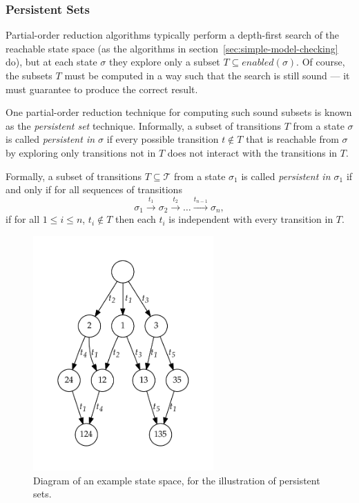 \documentclass[12pt,a4paper,twoside,openright]{report}
\begin{document}
\subsubsection{Persistent Sets}
Partial-order reduction algorithms typically 
perform a depth-first
search of the reachable state space
(as the algorithms in
section~\ref{sec:simple-model-checking} do), but at each
state $\sigma$ they explore only a subset
$T \subseteq \textit{enabled}(\sigma)$. Of course, the subsets
$T$ must be computed in a way such that the search
is still sound --- it must guarantee to
produce the correct result.

One partial-order reduction technique for
computing such sound subsets is known
as the \emph{persistent set} technique. Informally,
a subset of transitions $T$ from a state $\sigma$
is called \emph{persistent in $\sigma$} if every
possible transition $t \not \in T$ that is reachable
from $\sigma$ by exploring only transitions not in
$T$ does not interact with the transitions
in $T$.

Formally, a subset of transitions $T \subseteq \mathcal{T}$
from a state $\sigma_1$
is called \emph{persistent in $\sigma_1$} if and only if
for all sequences of transitions
\[
	\sigma_1 \xrightarrow{\ t_1\ } \sigma_2 \xrightarrow{\ t_2\ } \ldots
	\xrightarrow{t_{n-1}} \sigma_n,
\]
if for all $1 \leq i \leq n$, $t_i \not \in T$ then each $t_i$ is
independent with every transition in $T$.

\begin{figure}[h]
	\centering
	\includegraphics[height=9cm]{persistent1}
	\caption{Diagram of an example state space, for
		the illustration of persistent sets.}
	\label{fig:persistent}
\end{figure}
\end{document}
